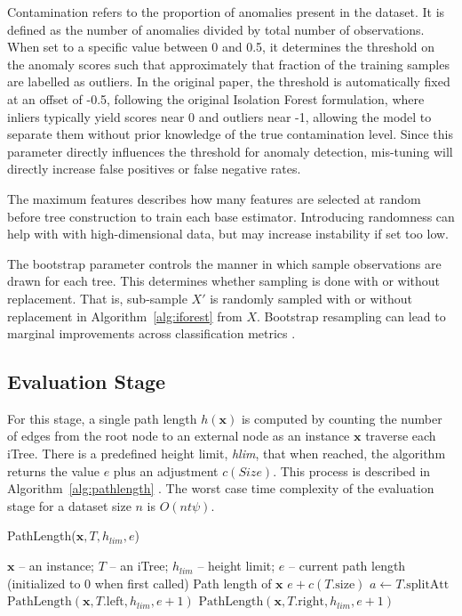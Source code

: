 \documentclass[10pt, conference]{IEEEtran}
\begin{document}
Contamination refers to the proportion of anomalies present in the dataset. It is defined as the number of anomalies divided by total number of observations. When set to a specific value between 0 and 0.5, it determines the threshold on the anomaly scores such that approximately that fraction of the training samples are labelled as outliers. In the original paper, the threshold is automatically fixed at an offset of -0.5, following the original Isolation Forest formulation, where inliers typically yield scores near 0 and outliers near -1, allowing the model to separate them without prior knowledge of the true contamination level. Since this parameter directly influences the threshold for anomaly detection, mis-tuning will directly increase false positives or false negative rates.

The maximum features describes how many features are selected at random before tree construction to train each base estimator. Introducing randomness can help with with high-dimensional data, but may increase instability if set too low.

The bootstrap parameter controls the manner in which sample observations are drawn for each tree. This determines whether sampling is done with or without replacement. That is, sub-sample $X'$ is randomly sampled with or without replacement in Algorithm~\ref{alg:iforest} from $X$. Bootstrap resampling can lead to marginal improvements across classification metrics \cite{Choi2025Impact}.

\subsection{Evaluation Stage}
For this stage, a single path length $h(\boldsymbol{x})$ is computed by counting the number of edges from the root node to an external node as an instance $\boldsymbol{x}$ traverse each iTree. There is a predefined height limit, \textit{hlim}, that when reached, the algorithm returns the value $e$ plus an adjustment $c(Size)$. This process is described in Algorithm~\ref{alg:pathlength} \cite{iforest2}. The worst case time complexity of the evaluation stage for a dataset size $n$ is $O(nt \psi)$.

\begin{algorithm}[H]
	\caption{PathLength($\boldsymbol{x}, T, h_{lim}, e$)}
	\label{alg:pathlength}
	\begin{algorithmic}[1]
		\Require $\boldsymbol{x}$ -- an instance; $T$ -- an iTree; $h_{lim}$ -- height limit; $e$ -- current path length (initialized to 0 when first called)
		\Ensure Path length of $\boldsymbol{x}$
		\State \Return $e + c(T.\text{size})$ 
		\Else
		\State $a \gets T.\text{splitAtt}$
		\State \Return $\text{PathLength}(\boldsymbol{x}, T.\text{left}, h_{lim}, e + 1)$
		\Else
		\State \Return $\text{PathLength}(\boldsymbol{x}, T.\text{right}, h_{lim}, e + 1)$
		\EndIf
		\EndIf
	\end{algorithmic}
\end{algorithm}
\end{document}
